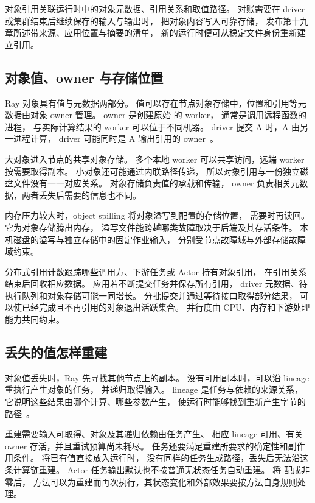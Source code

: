 对象引用关联运行时中的对象元数据、引用关系和取值路径。
对账需要在 driver 或集群结束后继续保存的输入与输出时，
把对象内容写入可靠存储，
发布第十九章所述带来源、应用位置与摘要的清单，
新的运行时便可从稳定文件身份重新建立引用。

\subsection{对象值、owner 与存储位置}

Ray 对象具有值与元数据两部分。
值可以存在节点对象存储中，位置和引用等元数据由对象 owner 管理。
owner 是创建原始  的 worker，
通常是调用远程函数的进程，
与实际计算结果的 worker 可以位于不同机器。
driver 提交 A 时，A 由另一进程计算，
driver 可能同时是 A 输出引用的 owner~\cite{ray259-objects}。

大对象进入节点的共享对象存储。
多个本地 worker 可以共享访问，远端 worker 按需要取得副本。
小对象还可能通过内联路径传递，
所以对象引用与一份独立磁盘文件没有一一对应关系。
对象存储负责值的承载和传输，
owner 负责相关元数据，两者丢失后需要的信息也不同。


内存压力较大时，object spilling 将对象溢写到配置的存储位置，
需要时再读回。
它为对象存储腾出内存，
溢写文件能跨越哪类故障取决于后端及其存活条件。
本机磁盘的溢写与独立存储中的固定作业输入，
分别受节点故障域与外部存储故障域约束。

分布式引用计数跟踪哪些调用方、下游任务或 Actor 持有对象引用，
在引用关系结束后回收相应数据。
应用若不断提交任务并保存所有引用，
driver 元数据、待执行队列和对象存储可能一同增长。
分批提交并通过等待接口取得部分结果，
可以使已经完成且不再引用的对象退出活跃集合。
并行度由 CPU、内存和下游处理能力共同约束。

\subsection{丢失的值怎样重建}

对象值丢失时，Ray 先寻找其他节点上的副本。
没有可用副本时，可以沿 lineage 重执行产生对象的任务，
并递归取得输入。
lineage 是任务与依赖的来源关系，
它说明这些结果由哪个计算、哪些参数产生，
使运行时能够找到重新产生字节的路径~\cite{ray259-objects}。

重建需要输入可取得、对象及其递归依赖由任务产生、
相应 lineage 可用、有关 owner 存活，并且重试预算尚未耗尽。
任务还要满足重建所要求的确定性和副作用条件。
 将已有值直接放入运行时，
没有同样的任务生成路径，丢失后无法沿这条计算链重建。
Actor 任务输出默认也不按普通无状态任务自动重建。
将  配成非零后，
方法可以为重建而再次执行，其状态变化和外部效果要按方法自身规则处理。

